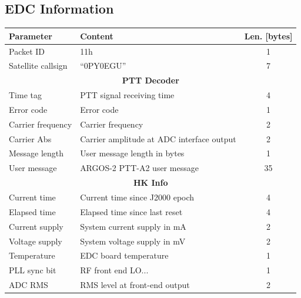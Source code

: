 \subsection{EDC Information}

\begin{table}[!h]
    \centering
    \begin{tabular}{llc}
        \toprule[1.5pt]
        \textbf{Parameter} & \textbf{Content}                                 & \textbf{Len. [bytes]} \\
        \midrule
        Packet ID          & 11h                                              & 1 \\
        Satellite callsign & ``0PY0EGU''                                      & 7 \\
        \midrule
        \multicolumn{3}{c}{\textbf{PTT Decoder}} \\
        \midrule
        Time tag           & PTT signal receiving time                        & 4 \\
        Error code         & Error code                                       & 1 \\
        Carrier frequency  & Carrier frequency                                & 2 \\
        Carrier Abs        & Carrier amplitude at ADC interface output        & 2 \\
        Message length     & User message length in bytes                     & 1 \\
        User message       & ARGOS-2 PTT-A2 user message                      & 35 \\
        \midrule
        \multicolumn{3}{c}{\textbf{HK Info}} \\
        \midrule
        Current time       & Current time since J2000 epoch                   & 4 \\
        Elapsed time       & Elapsed time since last reset                    & 4 \\
        Current supply     & System current supply in mA                      & 2 \\
        Voltage supply     & System voltage supply in mV                      & 2 \\
        Temperature        & EDC board temperature                            & 1 \\
        PLL sync bit       & RF front end LO...                               & 1 \\
        ADC RMS            & RMS level at front-end output                    & 2 \\

\end{tabular}
\end{table}
